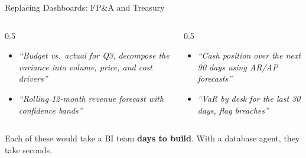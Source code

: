 \documentclass[aspectratio=169]{beamer}
\begin{document}
\begin{frame}{Replacing Dashboards: FP\&A and Treasury}
\begin{columns}[T]
\begin{column}{0.5\textwidth}
\begin{shadedbox}[title=\textbf{FP\&A}]
\begin{itemize}\small
  \item \textit{``Budget vs.\ actual for Q3, decompose the variance into volume, price, and cost drivers''}
  \item \textit{``Rolling 12-month revenue forecast with confidence bands''}
\end{itemize}
\end{shadedbox}
\end{column}
\begin{column}{0.5\textwidth}
\begin{shadedbox}[title=\textbf{Treasury \& Risk}]
\begin{itemize}\small
  \item \textit{``Cash position over the next 90 days using AR/AP forecasts''}
  \item \textit{``VaR by desk for the last 30 days, flag breaches''}
\end{itemize}
\end{shadedbox}
\end{column}
\end{columns}
\vspace{0.3cm}
Each of these would take a BI team \textbf{days to build}. With a database agent, they take \alert{seconds}.
\end{frame}
\end{document}
